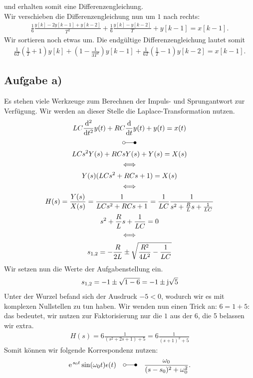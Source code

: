 \documentclass[11pt,a4paper,DIV=12]{scrartcl}
\begin{document}
und erhalten somit eine Differenzengleichung.\\
Wir verschieben die Differenzengleichung nun um $1$ nach rechts:
\begin{gather}
	\frac{1}{6}\frac{y[k]-2y[k-1]+y[k-2]}{T^2}+\frac{1}{6}\frac{y[k]-y[k-2]}{T}+y[k-1]=x[k-1].
\end{gather}
Wir sortieren noch etwas um. Die endgültige Differenzengleichung lautet somit
\begin{gather}
	\frac{1}{6T}\left(\frac{1}{T}+1\right)y[k]+\left(1-\frac{1}{3T^2}\right)y[k-1]+\frac{1}{6T}\left(\frac{1}{T}-1\right)y[k-2]=x[k-1].
\end{gather}
\subsection{Aufgabe a)}
Es stehen viele Werkzeuge zum Berechnen der Impuls- und Sprungantwort zur Verfügung. Wir werden an dieser Stelle die Laplace-Transformation nutzen.
\begin{gather}
	LC \frac{\mathrm{d} ^2}{\mathrm{d} t^2}y(t)+RC\frac{\mathrm{d}}{\mathrm{d} t}y(t)+y(t)=x(t)\\
	\laplace\nonumber\\
	LCs^2Y(s)+RCsY(s)+Y(s)=X(s)\\
	\Longleftrightarrow\nonumber\\
	Y(s)(LCs^2+RCs+1)=X(s)\\
	\Longleftrightarrow\nonumber\\
	H(s)=\frac{Y(s)}{X(s)}=\frac{1}{LCs^2+RCs+1}=\frac{1}{LC}\frac{1}{s^2+\frac{R}{L}s+\frac{1}{LC}}\\
	s^2+\frac{R}{L}s+\frac{1}{LC}=0\\
	\Longleftrightarrow\nonumber\\
	s_{1,2}=-\frac{R}{2L}\pm\sqrt{\frac{R^2}{4L^2}-\frac{1}{LC}}
\end{gather}
Wir setzen nun die Werte der Aufgabenstellung ein.
\begin{gather}
	s_{1,2}=-1\pm\sqrt{1-6}=-1\pm\im\sqrt{5}
\end{gather}
Unter der Wurzel befand sich der Ausdruck $-5<0$, wodurch wir es mit komplexen Nullstellen zu tun haben. Wir wenden nun einen Trick an: $6 = 1 + 5$: das bedeutet, wir nutzen zur Faktorisierung nur die $1$ aus der $6$, die 5 belassen wir extra.
\begin{align}
	H(s)=6\frac{1}{(s^2+2s+1)+5}=6\frac{1}{(s+1)^2+5}
\end{align}
Somit können wir folgende Korrespondenz nutzen:
\begin{gather}
	\e^{s_0t}\sin(\omega_0 t)\epsilon(t)\quad\laplace\quad\frac{\omega_0}{(s-s_0)^2+\omega_0^2}.
\end{gather}
\end{document}
